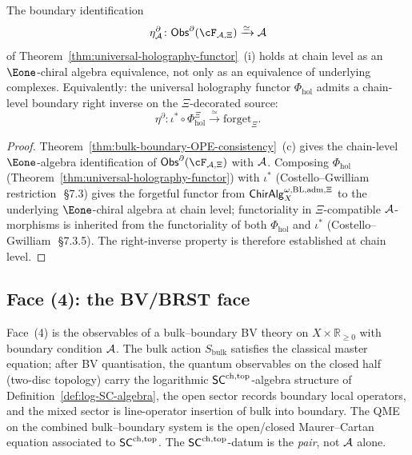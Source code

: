 \begin{corollary}
\label{cor:UHF-boundary-move-2-chain-level}
The boundary identification
\[
\eta^\partial_\cA\colon
\Obs^\partial(\cF_{\cA,\Xi})\xrightarrow{\simeq}\cA
\]
of
Theorem~\ref{thm:universal-holography-functor}~(i) holds at chain
level as an $\Eone$-chiral algebra equivalence, not only as an
equivalence of underlying complexes. Equivalently: the universal
holography functor $\Phi_{\mathrm{hol}}$ admits a chain-level
boundary right inverse on the \(\Xi\)-decorated source:
\[
\eta^\partial\colon
\iota^*\circ\Phi_{\mathrm{hol}}^\Xi
\xrightarrow{\simeq}
\mathrm{forget}_{\Xi}.
\]
\end{corollary}

\begin{proof}
Theorem~\ref{thm:bulk-boundary-OPE-consistency}~(c) gives the
chain-level $\Eone$-algebra identification of
$\Obs^\partial(\cF_{\cA,\Xi})$ with $\mathcal{A}$. Composing
$\Phi_{\mathrm{hol}}$ (Theorem~\ref{thm:universal-holography-functor})
with $\iota^*$ (Costello--Gwilliam restriction~\cite{CG21}\,\S7.3)
gives the forgetful functor from
\(\mathsf{ChirAlg}^{\omega,\mathrm{BL,adm},\Xi}_X\) to the underlying
\(\Eone\)-chiral algebra at chain level; functoriality in
\(\Xi\)-compatible \(\mathcal{A}\)-morphisms is inherited from the
functoriality of both $\Phi_{\mathrm{hol}}$ and $\iota^*$
(Costello--Gwilliam~\cite{CG21}\,\S7.3.5). The right-inverse
property is therefore established at chain level.
\end{proof}

\subsection{Face (4): the BV/BRST face}\label{subsec:face-bv-brst}

Face~(4) is the observables of a bulk--boundary BV theory on
$X\times\mathbb{R}_{\geq 0}$ with boundary condition $\mathcal{A}$. The bulk
action $S_{\mathrm{bulk}}$ satisfies the classical master equation;
after BV quantisation, the quantum observables on the closed half
(two-disc topology) carry the logarithmic
$\mathsf{SC}^{\mathrm{ch},\mathrm{top}}$-algebra structure of
Definition~\ref{def:log-SC-algebra}, the open sector records
boundary local operators, and the mixed sector is line-operator
insertion of bulk into boundary. The QME on the combined bulk--boundary
system is the open/closed Maurer--Cartan equation associated to
$\mathsf{SC}^{\mathrm{ch},\mathrm{top}}$. The $\mathsf{SC}^{\mathrm{ch},\mathrm{top}}$-datum is the \emph{pair}, not
$\mathcal{A}$ alone.

